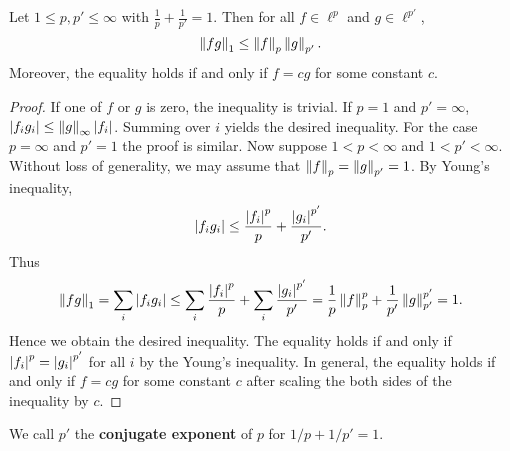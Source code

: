 \begin{theorem}
    Let $1\leq p,p'\leq\infty$ with $\frac{1}{p}+\frac{1}{p'}=1$. 
    Then for all $f\in\ell^p$ and $g\in\ell^{p'}$, 
    \begin{equation*}
        \left\lVert {fg} \right\rVert_1 \leq \left\lVert {f} \right\rVert_p\left\lVert {g} \right\rVert_{p'}.
    \end{equation*}
    Moreover, the equality holds if and only if $f = cg$ for some 
    constant $c$.
\end{theorem}
\begin{proof}
    If one of $f$ or $g$ is zero, the inequality is trivial.
    If $p = 1$ and $p' = \infty$, $\left\lvert {f_ig_i} \right\rvert \leq \left\lVert {g} \right\rVert_{\infty}\left\lvert {f_i} \right\rvert$. 
    Summing over $i$ yields the desired inequality. For the case 
    $p = \infty$ and $p' = 1$ the proof is similar. Now suppose
    $1<p<\infty$ and $1<p'<\infty$. Without loss of generality, 
    we may assume that $\left\lVert {f} \right\rVert_p = \left\lVert {g} \right\rVert_{p'} = 1$.
    By Young's inequality, 
    \begin{equation*}
        \left\lvert {f_ig_i} \right\rvert \leq \frac{\left\lvert {f_i} \right\rvert^p}{p} + \frac{\left\lvert {g_i} \right\rvert^{p'}}{p'}.
    \end{equation*}
    Thus 
    \begin{equation*}
        \left\lVert {fg} \right\rVert_1 = \sum_i \left\lvert {f_ig_i} \right\rvert \leq \sum_i \frac{\left\lvert {f_i} \right\rvert^p}{p} + \sum_i\frac{\left\lvert {g_i} \right\rvert^{p'}}{p'} 
        = \frac{1}{p}\left\lVert {f} \right\rVert_p^p + \frac{1}{p'}\left\lVert {g} \right\rVert_{p'}^{p'} = 1.
    \end{equation*}
    Hence we obtain the desired inequality. The equality holds if 
    and only if $\left\lvert {f_i} \right\rvert^p = \left\lvert {g_i} \right\rvert^{p'}$ for all $i$ by the 
    Young's inequality. In general, the equality holds if and 
    only if $f = cg$ for some constant $c$ after scaling the 
    both sides of the inequality by $c$. 
\end{proof}
\begin{remark}
    We call $p'$ the \textbf{conjugate exponent} of $p$ for 
    $1/p + 1/p' = 1$.
\end{remark}

